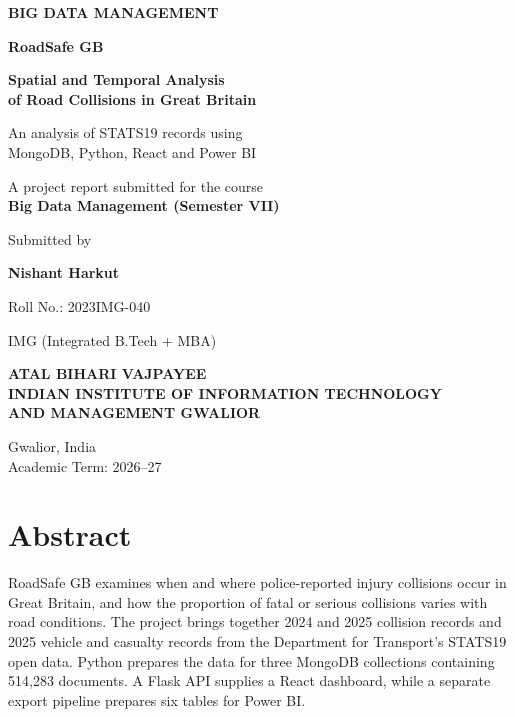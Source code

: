 \documentclass[11pt,a4paper]{article}
\begin{document}
\hypersetup{pageanchor=false}
\begin{titlepage}
\centering
\vspace*{12mm}
{\sffamily\small\bfseries\color{teal}BIG DATA MANAGEMENT\par}
\vspace{14mm}
{\sffamily\Huge\bfseries\color{ink}RoadSafe GB\par}
\vspace{6mm}
{\sffamily\LARGE\bfseries\color{ink}Spatial and Temporal Analysis\\[2mm]of Road Collisions in Great Britain\par}
\vspace{8mm}
{\large An analysis of STATS19 records using\\MongoDB, Python, React and Power BI\par}
\vspace{16mm}
{\large A project report submitted for the course\\[2mm]\textbf{Big Data Management (Semester VII)}\par}
\vspace{16mm}
{\normalsize Submitted by\par}
\vspace{3mm}
{\Large\bfseries Nishant Harkut\par}
\vspace{3mm}
{\large Roll No.: 2023IMG-040\par}
\vspace{2mm}
{\large IMG (Integrated B.Tech + MBA)\par}
\vfill
{\sffamily\bfseries\color{ink}ATAL BIHARI VAJPAYEE\\[2mm]INDIAN INSTITUTE OF INFORMATION TECHNOLOGY\\[2mm]AND MANAGEMENT GWALIOR\par}
\vspace{5mm}
{Gwalior, India\\Academic Term: 2026--27\par}
\end{titlepage}
\hypersetup{pageanchor=true}
\section*{Abstract}
RoadSafe GB examines when and where police-reported injury collisions occur in Great Britain, and how the proportion of fatal or serious collisions varies with road conditions. The project brings together 2024 and 2025 collision records and 2025 vehicle and casualty records from the Department for Transport's STATS19 open data. Python prepares the data for three MongoDB collections containing 514,283 documents. A Flask API supplies a React dashboard, while a separate export pipeline prepares six tables for Power BI.
\end{document}
